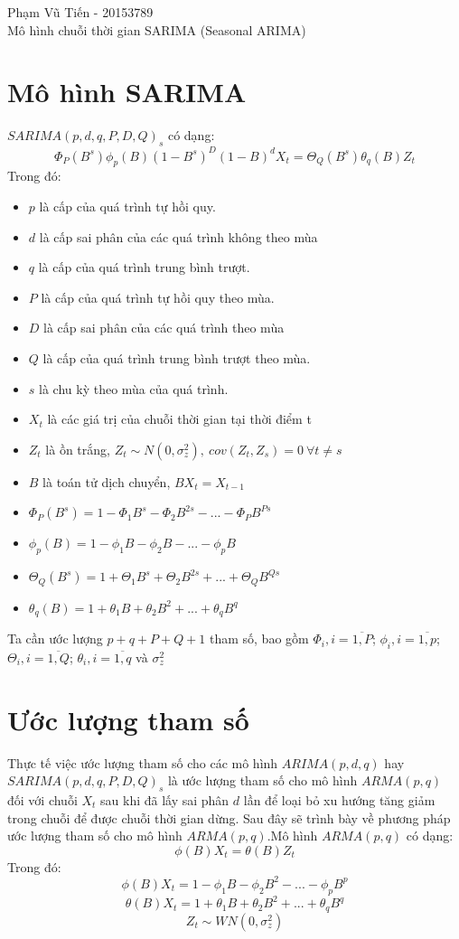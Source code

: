 \documentclass[a4paper, 12pt]{article}
\author{Phạm Vũ Tiến}
\theoremstyle{plain}
\theoremstyle{definition}
\numberwithin{equation}{section}
\begin{document}
	
	Phạm Vũ Tiến - 20153789\\
	Mô hình chuỗi thời gian SARIMA (Seasonal ARIMA)\\
\section{Mô hình SARIMA}
	$SARIMA(p,d,q,P,D,Q)_s$ có dạng:
	$$\Phi_P(B^s)\phi_p(B)(1-B^s)^D(1-B)^dX_t = \Theta_Q(B^s)\theta_q(B)Z_t$$
	Trong đó: 
\begin{itemize}
 \item	$p$ là cấp của quá trình tự hồi quy.
 \item	$d$ là cấp sai phân của các quá trình không theo mùa
 \item	$q$ là cấp của quá trình trung bình trượt.
 \item  $P$ là cấp của quá trình tự hồi quy theo mùa.
 \item  $D$ là cấp sai phân của các quá trình theo mùa
 \item  $Q$ là cấp của quá trình trung bình trượt theo mùa.
 \item  $s$ là chu kỳ theo mùa của quá trình.
 \item  $X_t$ là các giá trị của chuỗi thời gian tại thời điểm t
 \item  $Z_t$ là ồn trắng, $Z_t \sim N(0, \sigma_z^2), \ cov(Z_t, Z_s) = 0 \ \forall t \neq s$
 \item $B$ là toán tử dịch chuyển, $BX_t = X_{t-1}$
 \item $\Phi_P(B^s) = 1 - \Phi_1B^s - \Phi_2B^{2s} - ... - \Phi_PB^{Ps}$
 \item $\phi_p(B) = 1 - \phi_1B - \phi_2B - ... - \phi_pB$
 \item $\Theta_Q(B^s) = 1 + \Theta_1B^s + \Theta_2B^{2s} + ... + \Theta_QB^{Qs}$
 \item $\theta_q(B) = 1 + \theta_1B + \theta_2B^2 + ... + \theta_qB^q$
\end{itemize}	

	Ta cần ước lượng $p + q + P + Q + 1$ tham số, bao gồm $\Phi_i, i = \overline{1, P}$; $\phi_i, i = \overline{1,p}$; $\Theta_i, i = \overline{1, Q}$; $\theta_i, i = \overline{1, q}$ và $\sigma_z^2$
 
\section{Ước lượng tham số}
Thực tế việc ước lượng tham số cho các mô hình $ARIMA(p, d, q)$ hay $SARIMA(p,d,q,P,D,Q)_s$ là ước lượng tham số cho mô hình $ARMA(p, q)$ đối với chuỗi $X_t$ sau khi đã lấy sai phân $d$ lần để loại bỏ xu hướng tăng giảm trong chuỗi để được chuỗi thời gian dừng. Sau đây sẽ trình bày về phương pháp ước lượng tham số cho mô hình $ARMA(p, q)$.Mô hình $ARMA(p, q)$ có dạng:
$$\phi(B)X_t = \theta(B)Z_t$$
Trong đó:
$$\phi(B)X_t = 1 - \phi_1B - \phi_2B^2 - ... - \phi_pB^p$$
$$\theta(B)X_t = 1 + \theta_1B + \theta_2B^2 + ... + \theta_qB^q$$
$$Z_t \sim WN(0, \sigma_z^2)$$
\end{document}
